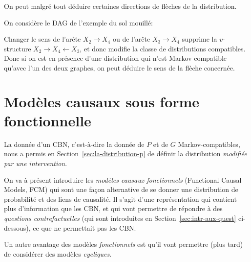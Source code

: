 On peut malgré tout déduire certaines directions de flèches de la
distribution.
\begin{example}
  On considère le DAG de l'exemple du sol mouillé:
\begin{center}
\end{center}
Changer le sens de l'arête $X_2\to X_4$ ou de l'arête
$X_3\to X_4$ supprime la $v$-structure $X_2\to X_4\leftarrow X_3$, et
donc modifie la classe de distributions compatibles. Donc si on est en
présence d'une distribution qui n'est Markov-compatible qu'avec l'un
des deux graphes, on peut déduire le sens de la flèche concernée.
\end{example}

\section{Modèles causaux sous forme fonctionnelle}
\label{sec:modeles-causaux-sous}

La donnée d'un CBN, c'est-à-dire la donnée de $P$ et de $G$
Markov-compatibles, nous a permis en Section~\ref{sec:la-distribution-p}  de définir la distribution \emph{modifiée par une intervention}. 

On va à présent introduire les \emph{modèles causaux fonctionnels}
(Functional Causal Models, FCM) qui sont une façon alternative de se
donner une distribution de probabilité et des liens de causalité.  Il
s'agit d'une représentation qui contient plus d'information que les
CBN, et qui vont permettre de répondre à des \emph{questions
  contrefactuelles} (qui sont introduites en
Section~\ref{sec:intr-aux-quest} ci-dessous), ce que ne permettait pas les CBN.

Un autre avantage des modèles \emph{fonctionnels} est qu'il vont
permettre (plus tard) de considérer des modèles \emph{cycliques}.

